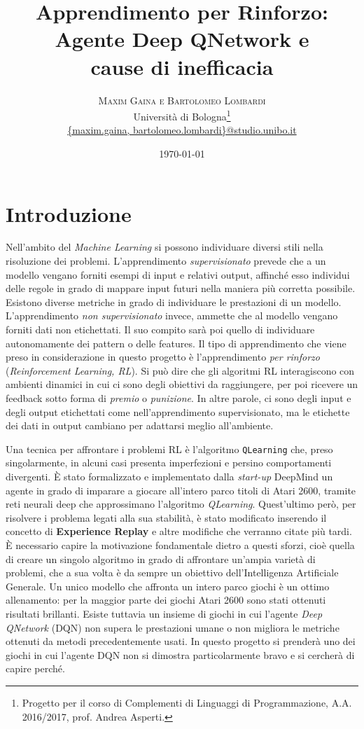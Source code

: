 \documentclass[twoside,twocolumn,10pt]{extarticle}
\title{Apprendimento per Rinforzo:\\Agente Deep Q\texttwelveudash Network e\\ cause di inefficacia} %
\author{%
\textsc{Maxim Gaina e Bartolomeo Lombardi} \\[1ex] %
\normalsize Università di Bologna\thanks{Progetto per il corso di Complementi di Linguaggi di Programmazione, A.A. 2016/2017, prof. Andrea Asperti.} \\ %
\normalsize \href{mailto:maxim.gaina@studio.unibo.it}{\{maxim.gaina, bartolomeo.lombardi\}@studio.unibo.it}
}
\date{\today} %
\theoremstyle{definition}
\begin{document}
\maketitle

\tableofcontents

\section*{Introduzione}
	\lettrine[nindent = 0.4em,lines=3]{N}\space\MakeTextLowercase{e}ll'ambito del \textit{Machine Learning} si possono individuare diversi stili nella risoluzione dei problemi. L'apprendimento \textit{supervisionato} prevede che a un modello vengano forniti esempi di input e relativi output, affinché esso individui delle regole in grado di mappare input futuri nella maniera più corretta possibile. Esistono diverse metriche in grado di individuare le prestazioni di un modello. L'apprendimento \textit{non supervisionato} invece, ammette che al modello vengano forniti dati non etichettati. Il suo compito sarà poi quello di individuare autonomamente dei pattern o delle features. Il tipo di apprendimento che viene preso in considerazione in questo progetto è l'apprendimento \textit{per rinforzo} (\textit{Reinforcement Learning, RL}). Si può dire che gli algoritmi RL interagiscono con ambienti dinamici in cui ci sono degli obiettivi da raggiungere, per poi ricevere un feedback sotto forma di \textit{premio} o \textit{punizione}. In altre parole, ci sono degli input e degli output etichettati come nell'apprendimento supervisionato, ma le etichette dei dati in output cambiano per adattarsi meglio all'ambiente.
	
	Una tecnica per affrontare i problemi RL è l'algoritmo \texttt{Q\texttwelveudash Learning} che, preso singolarmente, in alcuni casi presenta imperfezioni e persino comportamenti divergenti. È stato formalizzato e implementato dalla \textit{start-up} DeepMind un agente in grado di imparare a giocare all'intero parco titoli di Atari 2600, tramite reti neurali deep che approssimano l'algoritmo \textit{Q\texttwelveudash Learning}. Quest'ultimo però, per risolvere i problema legati alla sua stabilità, è stato modificato inserendo il concetto di \textbf{Experience Replay} e altre modifiche che verranno citate più tardi. È necessario capire la motivazione fondamentale dietro a questi sforzi, cioè quella di creare un singolo algoritmo in grado di affrontare un'ampia varietà di problemi, che a sua volta è da sempre un obiettivo dell'Intelligenza Artificiale Generale. Un unico modello che affronta un intero parco giochi è un ottimo allenamento: per la maggior parte dei giochi Atari 2600 sono stati ottenuti risultati brillanti. Esiste tuttavia un insieme di giochi in cui l'agente \textit{Deep Q\texttwelveudash Network} (DQN) non supera le prestazioni umane o non migliora le metriche ottenuti da metodi precedentemente usati. In questo progetto si prenderà uno dei giochi in cui l'agente DQN non si dimostra particolarmente bravo e si cercherà di capire perché.
	
\end{document}
